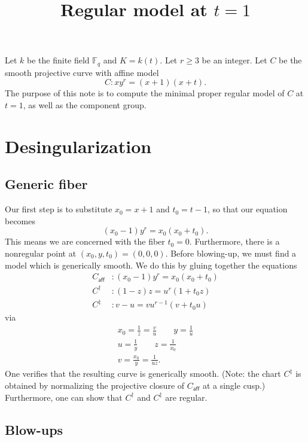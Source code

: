\documentclass[pagesize,paper=letter]{scrartcl}
\newcommand{\caff}{C_{\textsf{aff}}}
\theoremstyle{plain}
\theoremstyle{definition}
\theoremstyle{remark}
\newcommand{\F}{\ensuremath{\mathbb{F}}}
\begin{document}
\title{Regular model at $t=1$}
\maketitle

Let $k$ be the finite field $\F_q$ and $K = k(t)$. Let $r \geq 3$ be an integer. Let $C$ be the smooth projective curve with affine model
\[
C: xy^r = (x+1)(x+t).
\]
The purpose of this note is to compute the minimal proper regular model of $C$ at $t = 1$, as well as the component group.

\section{Desingularization}
\label{sec:desingularization}

\subsection{Generic fiber}
\label{sec:generic-fiber}

Our first step is to substitute $x_0 = x+1$ and $t_0 = t-1$, so that our equation becomes
\[
(x_0 - 1) y^r = x_0(x_0 + t_0).
\]
This means we are concerned with the fiber $t_0 = 0$. Furthermore, there is a nonregular point at $(x_0, y, t_0) = (0, 0, 0)$. Before blowing-up, we must find a model which is generically smooth. We do this by gluing together the equations
\begin{align*}
  \caff&: (x_0 - 1) y^r = x_0(x_0 + t_0)\\
  C^\dagger&: (1-z)z = u^r(1+t_0z) \\
  C^\ddag&: v-u = vu^{r-1}(v + t_0 u)
\end{align*}
via
\begin{gather*}
  x_0 = \frac{1}{z} = \frac{v}{u} \qquad y = \frac{1}{u} \\
  u = \frac{1}{y} \qquad z = \frac{1}{x_0} \\
  v = \frac{x_0}{y} = \frac{1}{uz}.
\end{gather*}
One verifies that the resulting curve is generically smooth. (Note: the chart $C^\ddag$ is obtained by normalizing the projective closure of $\caff$ at a single cusp.) Furthermore, one can show that $C^\dag$ and $C^\ddag$ are regular.

\subsection{Blow-ups}
\label{sec:blow-ups}
\end{document}
